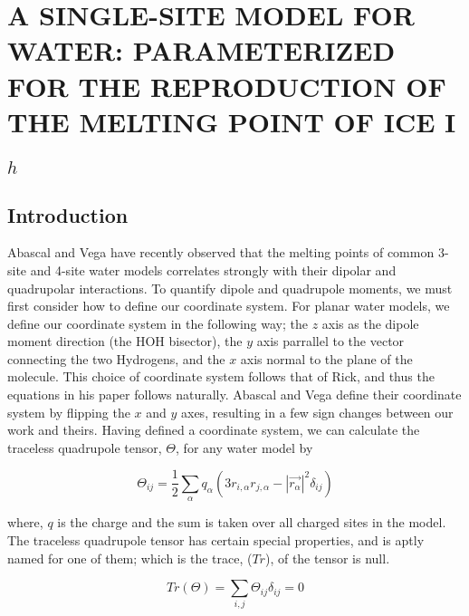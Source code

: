 

% 

\chapter{A SINGLE-SITE MODEL FOR WATER: PARAMETERIZED FOR THE REPRODUCTION OF THE MELTING POINT OF ICE I$_h$}


\section{Introduction}
Abascal and Vega have recently observed that the melting points of common 
3-site and 4-site water models correlates strongly with their dipolar and 
quadrupolar interactions.\cite{Abascal2007b,Abascal2007c,Abascal2007d} To quantify
dipole and quadrupole moments, we must first consider how to define our
coordinate system. For planar
water models, we define our coordinate system in the following way;
the $z$ axis as the dipole moment direction (the HOH bisector), the $y$ axis
parrallel to the vector connecting the two Hydrogens, and the $x$ axis normal 
to the plane of the molecule. This choice of coordinate system follows that of
Rick, and thus the equations in his paper follows naturally. 
Abascal and Vega define their coordinate system by flipping the $x$ and $y$
axes, resulting in a few sign changes between our work and theirs. Having 
defined a coordinate system, we can calculate the traceless quadrupole tensor,
$\Theta$, for any water model by

\begin{equation}
\Theta_{ij} = \frac{1}{2} \sum_{\alpha}q_{\alpha}(3r_{i,\alpha}r_{j,\alpha}-|\vec{r_{\alpha}}|^{2}\delta_{ij})
\end{equation}

where, $q$ is the charge and the sum is taken over all charged sites in the 
model. The traceless quadrupole tensor has certain special properties, and
is aptly named for one of them; which is the trace, ($Tr$), of the tensor 
is null.

\begin{equation}
Tr(\Theta) = \sum_{i,j}\Theta_{ij}\delta_{ij} = 0
\end{equation}

